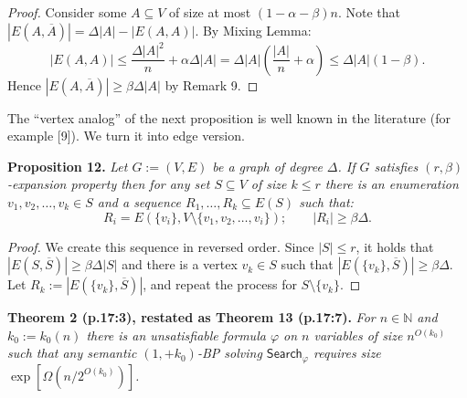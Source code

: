 \documentclass[10pt,a4paper]{article}
\newcommand{\Search}{\mathsf{Search}}
\newenvironment{result}[1]{\par\medskip\noindent\textbf{#1.}\itshape}{\par\medskip}
\begin{document}
\begin{proof}
Consider some $A\subseteq V$ of size at most $(1-\alpha-\beta)n$. Note that $|E(A,\overline A)|=\Delta|A|-|E(A,A)|$. By Mixing Lemma:
\[|E(A,A)|\le\frac{\Delta|A|^2}{n}+\alpha\Delta|A|=\Delta|A|\left(\frac{|A|}{n}+\alpha\right)\le\Delta|A|(1-\beta).\]
Hence $|E(A,\overline A)|\ge\beta\Delta|A|$ by Remark 9.
\end{proof}
The ``vertex analog'' of the next proposition is well known in the literature (for example [9]). We turn it into edge version.
\begin{result}{Proposition 12}
Let $G:=(V,E)$ be a graph of degree $\Delta$. If $G$ satisfies $(r,\beta)$-expansion property then for any set $S\subseteq V$ of size $k\le r$ there is an enumeration $v_1,v_2,\ldots,v_k\in S$ and a sequence $R_1,\ldots,R_k\subseteq E(S)$ such that:
\[R_i=E(\{v_i\},V\setminus\{v_1,v_2,\ldots,v_i\});\qquad |R_i|\ge\beta\Delta.\]
\end{result}
\begin{proof}
We create this sequence in reversed order. Since $|S|\le r$, it holds that $|E(S,\overline S)|\ge\beta\Delta|S|$ and there is a vertex $v_k\in S$ such that $|E(\{v_k\},\overline S)|\ge\beta\Delta$. Let $R_k:=|E(\{v_k\},\overline S)|$, and repeat the process for $S\setminus\{v_k\}$.
\end{proof}

\begin{result}{Theorem 2 (p.17:3), restated as Theorem 13 (p.17:7)}
For $n\in\mathbb N$ and $k_0:=k_0(n)$ there is an unsatisfiable formula $\varphi$ on $n$ variables of size $n^{O(k_0)}$ such that any semantic $(1,+k_0)$-BP solving $\Search_\varphi$ requires size $\exp[\Omega(n/2^{O(k_0)})]$.
\end{result}
\end{document}
